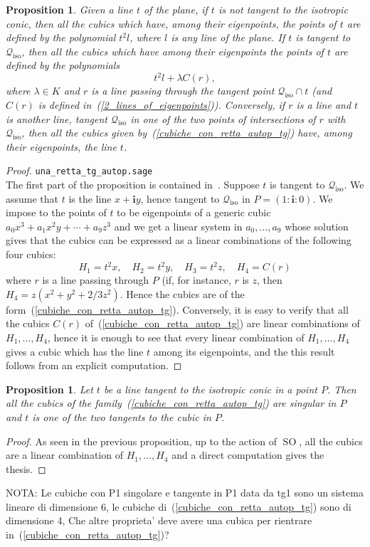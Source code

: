\documentclass{amsart}
\theoremstyle{plain}
\newtheorem{prop}[lemma]{Proposition}
\theoremstyle{definition}
\newcommand{\iso}{\mathcal{Q}_{\mathrm{iso}}}
\newcommand{\SO}{\operatorname{SO}}
\newcommand{\iii}{\textbf{i}}
\begin{document}
\begin{prop}
Given a line $t$ of the plane, if $t$ is not tangent to the isotropic
conic, then all the cubics which have, among their
eigenpoints, the points of $t$ are defined by the polynomial $t^2l$,
where $l$ is any line of the plane. If $t$ is tangent to $\iso$, then
all the cubics which have among their eigenpoints the points of $t$ are
defined by the polynomials
\begin{equation}
\label{cubiche_con_retta_autop_tg}
t^2l+\lambda C(r),
\end{equation}
where $\lambda \in K$ and $r$ is a line
passing through the tangent point $\iso\cap t$ (and $C(r)$ is defined
in~(\ref{2_lines_of_eigenpoints})). Conversely, if $r$ is a line and
$t$ is another line, tangent $\iso$ in one of the two points of intersections
of $r$ with $\iso$, then all the cubics given
by~(\ref{cubiche_con_retta_autop_tg}) have, among their eigenpoints,
the line $t$.
\end{prop}
\begin{proof}
\verb+una_retta_tg_autop.sage+\\
The first part of the proposition is contained in~.
Suppose $t$ is tangent to $\iso$. We assume that $t$ is the line
$x+\iii y$, hence tangent to $\iso$ in $P = (1: \iii: 0)$.
We impose to the points
of $t$ to be eigenpoints of a generic cubic $a_0x^3+a_1x^2y+\cdots+a_9z^3$
and we get a linear system in $a_0, \dots, a_9$ whose solution gives that
the cubics can be expressed as a linear combinations of the following
four cubics:
%
\[
H_1 = t^2x, \quad H_2 = t^2y, \quad H_3 = t^2z, \quad H_4 = C(r)
\]
%
where $r$ is a line passing through $P$ (if, for instance, $r$
is $z$, then $H_4 = z(x^2 + y^2 + 2/3z^2)$. Hence the cubics are of the
form~(\ref{cubiche_con_retta_autop_tg}). Conversely, it is easy to verify
that all the cubics $C(r)$ of~(\ref{cubiche_con_retta_autop_tg}) are
linear combinations of $H_1, \dots, H_4$, hence it is enough
to see that every linear combination of $H_1, \dots, H_4$ gives a
cubic which has the line $t$ among its eigenpoints, and the this result
follows from an explicit computation.
\end{proof}

\begin{prop}
Let $t$ be a line tangent to the isotropic conic in a point $P$. Then all the
cubics of the family~(\ref{cubiche_con_retta_autop_tg}) are singular in
$P$ and $t$ is one of the two tangents to the cubic in $P$.
\end{prop}
\begin{proof}
As seen in the previous proposition, up to the action of $\SO$, all the
cubics are a linear combination of $H_1, \dots, H_4$ and a direct
computation gives the thesis.
\end{proof}
NOTA: Le cubiche con P1 singolare e tangente in P1 data da tg1 sono
un sistema lineare di dimensione 6, le cubiche
di~(\ref{cubiche_con_retta_autop_tg}) sono di dimensione
4, Che altre proprieta' deve avere una cubica per rientrare
in~(\ref{cubiche_con_retta_autop_tg})?
\end{document}
